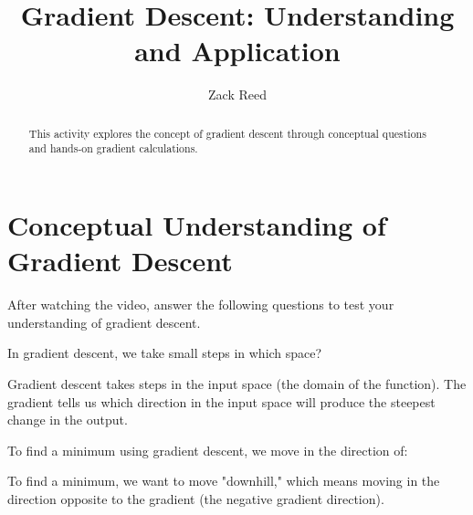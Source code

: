 \documentclass{ximera}
\title{Gradient Descent: Understanding and Application}
\author{Zack Reed}
\begin{document}
\begin{abstract}
This activity explores the concept of gradient descent through conceptual questions and hands-on gradient calculations.
\end{abstract}
\maketitle

\section{Conceptual Understanding of Gradient Descent}

After watching the video, answer the following questions to test your understanding of gradient descent.

\begin{exercise}
In gradient descent, we take small steps in which space?

\begin{multipleChoice}
\end{multipleChoice}

\begin{feedback}
Gradient descent takes steps in the input space (the domain of the function). The gradient tells us which direction in the input space will produce the steepest change in the output.
\end{feedback}
\end{exercise}

\begin{exercise}
To find a minimum using gradient descent, we move in the direction of:

\begin{multipleChoice}
\end{multipleChoice}

\begin{feedback}
To find a minimum, we want to move "downhill," which means moving in the direction opposite to the gradient (the negative gradient direction).
\end{feedback}
\end{exercise}
\end{document}
